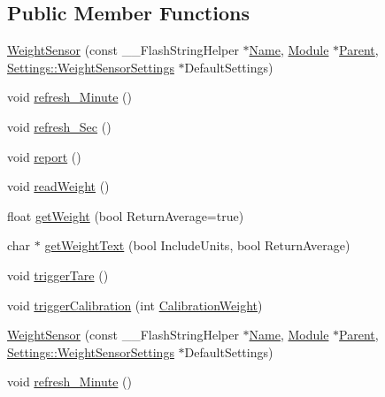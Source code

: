 \subsection*{Public Member Functions}
\begin{DoxyCompactItemize}
\item 
\hyperlink{class_weight_sensor_a7ea36c43abb037e5d88f6d181bd07b0d}{Weight\+Sensor} (const \+\_\+\+\_\+\+Flash\+String\+Helper $\ast$\hyperlink{class_common_aeea91a726dbe988e515057b32ba0726f}{Name}, \hyperlink{class_module}{Module} $\ast$\hyperlink{class_weight_sensor_abcba58bc00c355cc626499e019ac0d52}{Parent}, \hyperlink{struct_settings_1_1_weight_sensor_settings}{Settings\+::\+Weight\+Sensor\+Settings} $\ast$Default\+Settings)
\item 
void \hyperlink{class_weight_sensor_a3d0d70823fc37a32d8320189d15d448d}{refresh\+\_\+\+Minute} ()
\item 
void \hyperlink{class_weight_sensor_a6f7c6cab318b6677e43b7deb9e0b5fee}{refresh\+\_\+\+Sec} ()
\item 
void \hyperlink{class_weight_sensor_a1db622f4f2fb6971d0a4933d825c5c44}{report} ()
\item 
void \hyperlink{class_weight_sensor_ac4a6f05281cc7fa0c602e2f0b2efdbaa}{read\+Weight} ()
\item 
float \hyperlink{class_weight_sensor_a0a42742e1516e6723b1246e789ba9253}{get\+Weight} (bool Return\+Average=true)
\item 
char $\ast$ \hyperlink{class_weight_sensor_a4435433225f8b58950161e5a580d763e}{get\+Weight\+Text} (bool Include\+Units, bool Return\+Average)
\item 
void \hyperlink{class_weight_sensor_a54b241f48e63ef6b17eade0d55a78008}{trigger\+Tare} ()
\item 
void \hyperlink{class_weight_sensor_a37b50db6dc60c3bc6a22807af5e17283}{trigger\+Calibration} (int \hyperlink{class_weight_sensor_aed701fda701e06caf8ffdbbe6be8ad10}{Calibration\+Weight})
\item 
\hyperlink{class_weight_sensor_a7ea36c43abb037e5d88f6d181bd07b0d}{Weight\+Sensor} (const \+\_\+\+\_\+\+Flash\+String\+Helper $\ast$\hyperlink{class_common_aeea91a726dbe988e515057b32ba0726f}{Name}, \hyperlink{class_module}{Module} $\ast$\hyperlink{class_weight_sensor_abcba58bc00c355cc626499e019ac0d52}{Parent}, \hyperlink{struct_settings_1_1_weight_sensor_settings}{Settings\+::\+Weight\+Sensor\+Settings} $\ast$Default\+Settings)
\item 
void \hyperlink{class_weight_sensor_a3d0d70823fc37a32d8320189d15d448d}{refresh\+\_\+\+Minute} ()

\end{DoxyCompactItemize}
